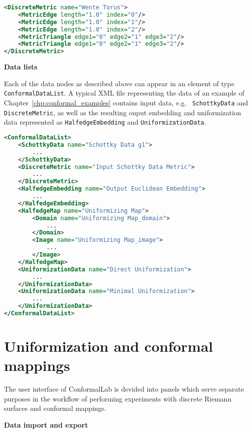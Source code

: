 \documentclass[Thesis.tex]{subfiles}
\begin{document}
\begin{lstlisting}[label=lst:discretemetric_xml, caption={A wente torus given by a discrete metric. Vertices are given implictly
by following the order of triangle glueings.}, numbers=none, language=XML, captionpos=b]
<DiscreteMetric name="Wente Torus">
	<MetricEdge length="1.0" index="0"/>
	<MetricEdge length="1.0" index="1"/>
	<MetricEdge length="1.0" index="2"/>
	<MetricTriangle edge1="0" edge2="1" edge3="2"/>
	<MetricTriangle edge1="0" edge2="1" edge3="2"/>
</DiscreteMetric>
\end{lstlisting}

{\bf Data lists}

Each of the data nodes as described above can appear in an element of type {\tt
ConformalDataList}. A typical XML file representing the data of an example of
Chapter~\ref{chp:conformal_examples} contains input data, e.g. {\tt
SchottkyData} and {\tt DiscreteMetric}, as well as the resulting ouput
embedding and uniformization data represented as {\tt HalfedgeEmbedding} and
{\tt UniformizationData}.

\begin{lstlisting}[label=lst:datalist_xml, caption={A list of data XML nodes as the result of an algorithm calculating the Fuchsian uniformization of a genus $1$ Riemann surface given by Schottky data.}, numbers=none, language=XML, captionpos=b]
<ConformalDataList>
	<SchottkyData name="Schottky Data g1">
		...
	</SchottkyData>
	<DiscreteMetric name="Input Schottky Data Metric">
		...
	</DiscreteMetric>
	<HalfedgeEmbedding name="Output Euclidean Embedding">
		...
	</HalfedgeEmbedding>
	<HalfedgeMap name="Uniformizing Map">
		<Domain name="Uniformizing Map_domain">
			...
		</Domain>
		<Image name="Uniformizing Map_image">
			...
		</Image>
	</HalfedgeMap>
	<UniformizationData name="Direct Uniformization">
		...
	</UniformizationData>
	<UniformizationData name="Minimal Uniformization">
		...
	</UniformizationData>
</ConformalDataList>
\end{lstlisting}

\section{Uniformization and conformal mappings} \label{sec:conformallab_ui} The
user interface of {\sc ConformalLab} is devided into panels which serve
separate purposes in the workflow of performing experiments with discrete
Riemann surfaces and conformal mappings.

{\bf Data import and export}
\end{document}
